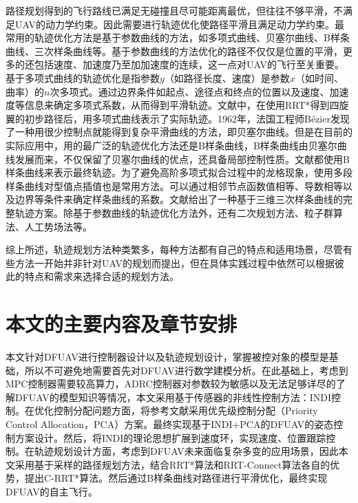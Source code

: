 路径规划得到的飞行路线已满足无碰撞且尽可能距离最优，但往往不够平滑，不满足UAV的动力学约束。因此需要进行轨迹优化使路径平滑且满足动力学约束。最常用的轨迹优化方法是基于参数曲线的方法，如多项式曲线、贝塞尔曲线、B样条曲线、三次样条曲线等。基于参数曲线的方法优化的路径不仅仅是位置的平滑，更多的还包括速度、加速度乃至加加速度的连续，这一点对UAV的飞行至关重要。基于多项式曲线的轨迹优化是指参数$y$（如路径长度、速度）是参数$x$（如时间、曲率）的$n$次多项式。通过边界条件如起点、途径点和终点的位置以及速度、加速度等信息来确定多项式系数，从而得到平滑轨迹。文献\cite{arshadQuadrotorPathPlanning2023}中，在使用RRT*得到四旋翼的初步路径后，用多项式曲线表示了实际轨迹。1962年，法国工程师Bézier发现了一种用很少控制点就能得到复杂平滑曲线的方法，即贝塞尔曲线。但是在目前的实际应用中，用的最广泛的轨迹优化方法还是B样条曲线，B样条曲线由贝塞尔曲线发展而来，不仅保留了贝塞尔曲线的优点，还具备局部控制性质。文献\parencite{huangResearchPathPlanning2022,eshtehardianContinuousRRTbasedPath2023,fengSmoothPathPlanning2024a}都使用B样条曲线来表示最终轨迹。为了避免高阶多项式拟合过程中的龙格现象，使用多段样条曲线对型值点插值也是常用方法。可以通过相邻节点函数值相等、导数相等以及边界等条件来确定样条曲线的系数。文献\parencite{coteComplex3DFlighta}给出了一种基于三维三次样条曲线的完整轨迹方案。除基于参数曲线的轨迹优化方法外，还有二次规划方法\cite{arshadQuadrotorPathPlanning2023}、粒子群算法\cite{shinUAVPathPlanning2020}、人工势场法\cite{sunUavPathPlanning2022}等。

综上所述，轨迹规划方法种类繁多，每种方法都有自己的特点和适用场景，尽管有些方法一开始并非针对UAV的规划而提出，但在具体实践过程中依然可以根据彼此的特点和需求来选择合适的规划方法。

\section{本文的主要内容及章节安排}

本文针对DFUAV进行控制器设计以及轨迹规划设计，掌握被控对象的模型是基础，所以不可避免地需要首先对DFUAV进行数学建模分析。在此基础上，考虑到MPC控制器需要较高算力，ADRC控制器对参数较为敏感以及无法足够详尽的了解DFUAV的模型知识等情况，本文采用基于传感器的非线性控制方法：INDI控制。在优化控制分配问题方面，将参考文献\parencite{HKXB202010026}采用优先级控制分配（Priority Control Allocation，PCA）方案。最终实现基于INDI+PCA的DFUAV的姿态控制方案设计。然后，将INDI的理论思想扩展到速度环，实现速度、位置跟踪控制。在轨迹规划设计方面，考虑到DFUAV未来面临复杂多变的应用场景，因此本文采用基于采样的路径规划方法，结合RRT*算法和RRT-Connect算法各自的优势，提出C-RRT*算法。然后通过B样条曲线对路径进行平滑优化，最终实现DFUAV的自主飞行。

